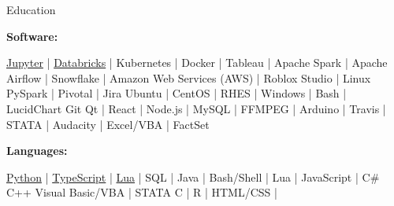 \documentclass{resume/resume}
\begin{document}
\begin{rSection}{Education}
\begin{adjustwidth}{6em}{0pt}
\end{adjustwidth}



\vspace{-3pt}
{\bf Software:}
\vspace{-1.83em}
\begin{adjustwidth}{6em}{0pt}
    \href{https://github.com/search?q=user\%3ASpelkington+user\%3AUtahTriangle+extension\%3Aipynb&type=Code}{Jupyter} | 
    \href{https://github.com/search?q=user\%3ASpelkington+databricks&type=Code}{Databricks} | 
    Kubernetes | 
    Docker | 
    Tableau | 
    Apache Spark | 
    Apache Airflow | 
    Snowflake | 
    Amazon Web Services (AWS) | 
    Roblox Studio | 
    Linux
    PySpark | 
    Pivotal | 
    Jira
    Ubuntu | 
    CentOS | 
    RHES | 
    Windows | 
    Bash | 
    LucidChart
    Git
    Qt | 
    React | 
    Node.js | 
    MySQL | 
    FFMPEG | 
    Arduino | 
    Travis | 
    STATA | 
    Audacity | 
    Excel/VBA | 
    FactSet

\end{adjustwidth}

\end{rSection}



\vspace{-0.4em}
{\bf Languages:}
\vspace{-1.83em}
\begin{adjustwidth}{6em}{0pt}
    \href{https://github.com/search?q=user\%3ASpelkington+user\%3AUtahTriangle+extension\%3Apy+extension\%3Aipynb&type=Code&ref=advsearch&l=&l=}{Python} | 
    \href{https://github.com/search?p=1&q=user\%3ASpelkington+extension\%3Ats+extension\%3Atsx&type=Code}{TypeScript} | 
    \href{https://github.com/search?q=user\%3ASpelkington+extension\%3Alua&type=Code}{Lua} | 
    SQL | 
    Java | 
    Bash/Shell | 
    Lua | 
    JavaScript | 
    C\#
    C++
    Visual Basic/VBA | 
    STATA
    C | 
    R |
    HTML/CSS |
\end{adjustwidth}

\end{document}
